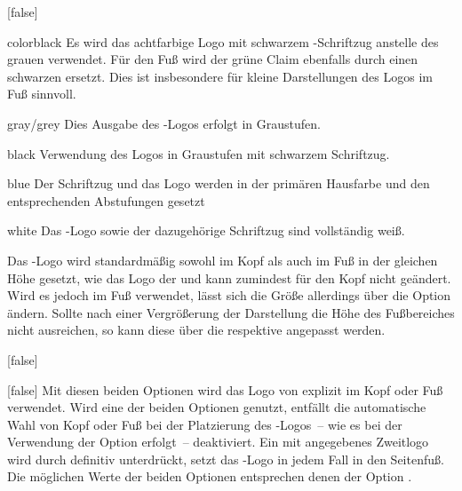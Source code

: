 \begin{Declaration*}{}
\begin{Declaration*}{}
\begin{Declaration*}{}
\begin{Declaration}[%
  v2.02:Logo von \DDC automatisch in Kopf/Fuß;%
  v2.02!\Option{ddc=colorblack};
  v2.02!\Option{ddc=gray};
  v2.02!\Option{ddc=black};
  v2.02!\Option{ddc=blue};
  v2.02!\Option{ddc=white};
]{}[false]
\begin{values}{}
\item[colorblack]
  Es wird das achtfarbige Logo mit schwarzem \DDC-Schriftzug anstelle des 
  grauen verwendet. Für den Fuß wird der grüne Claim ebenfalls durch einen 
  schwarzen ersetzt. Dies ist insbesondere für kleine Darstellungen des Logos 
  im Fuß sinnvoll.
\item[gray/grey]
  Dies Ausgabe des \DDC-Logos erfolgt in Graustufen.
\item[black]
  Verwendung des Logos in Graustufen mit schwarzem Schriftzug.
\item[blue]
  Der Schriftzug und das Logo werden in der primären Hausfarbe  
  und den entsprechenden Abstufungen gesetzt
\item[white]
  Das \DDC-Logo sowie der dazugehörige Schriftzug sind vollständig weiß.
\end{values}
%
Das \DDC-Logo wird standardmäßig sowohl im Kopf als auch im Fuß in der gleichen 
Höhe gesetzt, wie das Logo der \TnUD und kann zumindest für den Kopf nicht 
geändert. Wird es jedoch im Fuß verwendet, lässt sich die Größe allerdings über 
die Option  ändern. Sollte nach einer Vergrößerung der 
Darstellung die Höhe des Fußbereiches nicht ausreichen, so kann diese über die 
 respektive 
 angepasst werden.
\end{Declaration}

\begin{Declaration}[v2.02]{}[false]
\begin{Declaration}[%
  v2.02!\Option{ddcfoot=colorblack};
  v2.02!\Option{ddcfoot=gray};
  v2.02!\Option{ddcfoot=black};
  v2.02!\Option{ddcfoot=blue};
  v2.02!\Option{ddcfoot=white};
]{}[false]
\printdeclarationlist%
%
%
%
%
%
Mit diesen beiden Optionen wird das Logo von \DDC explizit im Kopf oder Fuß 
verwendet. Wird eine der beiden Optionen genutzt, entfällt die automatische 
Wahl von Kopf oder Fuß bei der Platzierung des \DDC-Logos~-- wie es bei der 
Verwendung der Option  erfolgt~-- deaktiviert. Ein mit
 angegebenes Zweitlogo wird durch  
definitiv unterdrückt,  setzt das \DDC-Logo in jedem Fall 
in den Seitenfuß. Die möglichen Werte der beiden Optionen entsprechen denen der 
Option .
%
\end{Declaration}
\end{Declaration}


\end{Declaration*}
\end{Declaration*}
\end{Declaration*}
